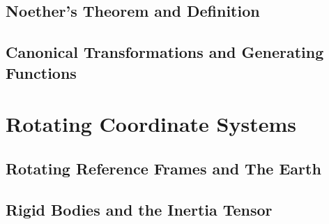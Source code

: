 \documentclass[12pt,%
               a4paper]{physics_notes}
\begin{document}
\subsection{Noether's Theorem and Definition} %
\subsection{Canonical Transformations and Generating Functions}

\section{Rotating Coordinate Systems}
\subsection{Rotating Reference Frames and The Earth}
\subsection{Rigid Bodies and the Inertia Tensor}
 
\end{document}
